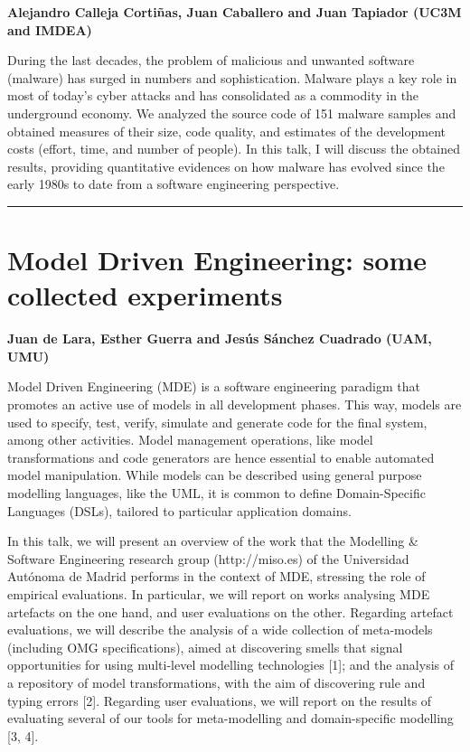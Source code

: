 \documentclass[11pt,pressrelease]{newlfm} %
\begin{document}
\begin{newlfm}
{\bf Alejandro Calleja Cortiñas, Juan Caballero and Juan Tapiador (UC3M and IMDEA)}

During the last decades, the problem of malicious and unwanted software (malware) has surged in numbers and sophistication. Malware plays a key role in most of today’s cyber attacks and has consolidated as a commodity in the underground economy. We analyzed the source code of 151 malware samples and obtained measures of their size, code quality, and estimates of the development costs (effort, time, and number of people). In this talk, I will discuss the obtained results, providing quantitative evidences on how malware has evolved since the early 1980s to date from a software engineering perspective.


\rule{\textwidth}{1pt} \par \noindent
\section{Model Driven Engineering: some collected experiments}

{\bf Juan de Lara, Esther Guerra and Jes\'us S\'anchez Cuadrado (UAM, UMU)}

Model Driven Engineering (MDE) is a software engineering paradigm that promotes an active use of models in all development phases. This way, models are used to specify, test, verify, simulate and generate code for the final system, among other activities. Model management operations, like model transformations and code generators are hence essential to enable automated model manipulation. While models can be described using general purpose modelling languages, like the UML, it is common to define Domain-Specific Languages (DSLs), tailored to particular application domains.

In this talk, we will present an overview of the work that the Modelling \& Software Engineering research group (http://miso.es) of the Universidad Aut\'onoma de Madrid performs in the context of MDE, stressing the role of empirical evaluations. In particular, we will report on works analysing MDE artefacts on the one hand, and user evaluations on the other. Regarding artefact evaluations, we will describe the analysis of a wide collection of meta-models (including OMG specifications), aimed at discovering smells that signal opportunities for using multi-level modelling technologies [1]; and the analysis of a repository of model transformations, with the aim of discovering rule and typing errors [2]. Regarding user evaluations, we will report on the results of evaluating several of our tools for meta-modelling and domain-specific modelling [3, 4].


\end{newlfm}
\end{document}
